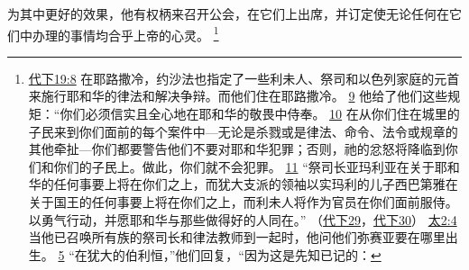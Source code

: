 \documentclass[12pt, a4paper, oneside]{ctexart}
\begin{document}
	为其中更好的效果，他有权柄来召开公会，在它们上出席，并订定使无论任何在它们中办理的事情均合乎上帝的心灵。
	\footnote {
		\href{https://biblehub.com/2_chronicles/19-8.htm}{代下19:8} 在耶路撒冷，约沙法也指定了一些利未人、祭司和以色列家庭的元首来施行耶和华的律法和解决争辩。而他们住在耶路撒冷。
		\href{https://biblehub.com/2_chronicles/19-9.htm}{9} 他给了他们这些规矩：“你们必须信实且全心地在耶和华的敬畏中侍奉。
		\href{https://biblehub.com/2_chronicles/19-10.htm}{10} 在从你们住在城里的子民来到你们面前的每个案件中---无论是杀戮或是律法、命令、法令或规章的其他牵扯---你们都要警告他们不要对耶和华犯罪；否则，祂的忿怒将降临到你们和你们的子民上。做此，你们就不会犯罪。
		\href{https://biblehub.com/2_chronicles/19-11.htm}{11} “祭司长亚玛利亚在关于耶和华的任何事要上将在你们之上，而犹大支派的领袖以实玛利的儿子西巴第雅在关于国王的任何事要上将在你们之上，而利未人将作为官员在你们面前服侍。以勇气行动，并愿耶和华与那些做得好的人同在。”
		（\href{https://biblehub.com/niv/2_chronicles/29.htm}{代下29}，\href{https://biblehub.com/niv/2_chronicles/30.htm}{代下30}） 
		\href{https://biblehub.com/matthew/2-4.htm}{太2:4} 当他已召唤所有族的祭司长和律法教师到一起时，他问他们弥赛亚要在哪里出生。
		\href{https://biblehub.com/matthew/2-5.htm}{5} “在犹大的伯利恒，”他们回复，“因为这是先知已记的：
	}
\end{document}
